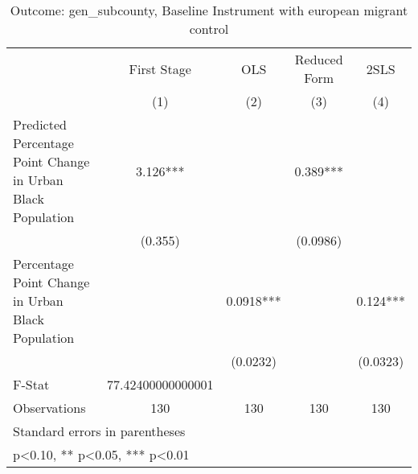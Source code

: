 \begin{table}[htbp]\centering
\def\sym#1{\ifmmode^{#1}\else\(^{#1}\)\fi}
\caption{Outcome: gen\_subcounty, Baseline Instrument with european migrant control}
\begin{tabular}{l*{4}{c}}
\toprule
                    & First Stage   &         OLS   &Reduced Form   &        2SLS   \\
                    &\multicolumn{1}{c}{(1)}   &\multicolumn{1}{c}{(2)}   &\multicolumn{1}{c}{(3)}   &\multicolumn{1}{c}{(4)}   \\
\midrule
Predicted Percentage Point Change in Urban Black Population&       3.126***&               &       0.389***&               \\
                    &     (0.355)   &               &    (0.0986)   &               \\
\addlinespace
Percentage Point Change in Urban Black Population&               &      0.0918***&               &       0.124***\\
                    &               &    (0.0232)   &               &    (0.0323)   \\
\midrule
F-Stat              &77.42400000000001   &               &               &               \\
Observations        &         130   &         130   &         130   &         130   \\
\bottomrule
\multicolumn{5}{l}{\footnotesize Standard errors in parentheses}\\
\multicolumn{5}{l}{\footnotesize * p<0.10, ** p<0.05, *** p<0.01}\\
\end{tabular}
\end{table}
